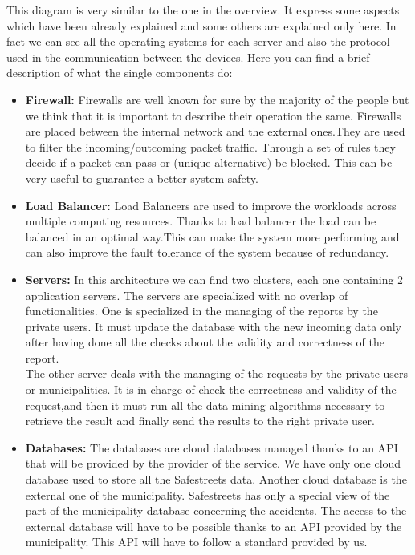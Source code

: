\documentclass[titlepage]{article}
\begin{document}
This diagram is very similar to the one in the overview. It express some aspects which have been already explained and some others are explained only here. In fact we can see all the operating systems for each server and also the protocol used in the communication between the devices.
Here you can find a brief description of what the single components do:
\begin{itemize}
\item \textbf{Firewall:} Firewalls are well known for sure by the majority of the people but we think that it is important to describe their operation the same. Firewalls are placed between the internal network and the external ones.They are used to filter the incoming/outcoming packet traffic. Through a set of rules they decide if a packet can pass or (unique alternative) be blocked.  This can be very useful to guarantee a better system safety.
\item \textbf{Load Balancer:} Load Balancers are used to improve the workloads across multiple computing resources. Thanks to load balancer the load can be balanced in an optimal way.This can make the system more performing and can also improve the fault tolerance of the system because of redundancy.
\item \textbf{Servers:} In this architecture we can find two clusters, each one containing 2 application servers. The servers are specialized with no overlap of functionalities. One is specialized in the managing of the reports by the private users. It must update the database with the new incoming data only after having done all the checks about the validity and correctness of the report.\\
The other server deals with the managing of the requests by the private users or municipalities. It is in charge of check the correctness and validity of the request,and then it must run all the data mining algorithms necessary to retrieve the result and finally send the results to the right private user.
\item \textbf{Databases:} The databases are cloud databases managed thanks to an API that will be provided by the provider of the service. We have only one cloud database used to store all the Safestreets data. Another cloud database is the external one of the municipality. Safestreets has only a special view of the part of the municipality database concerning the accidents. The access to the external database will have to be possible thanks to an API provided by the municipality. This API will have to follow a standard provided by us.
\end{itemize}
\end{document}
